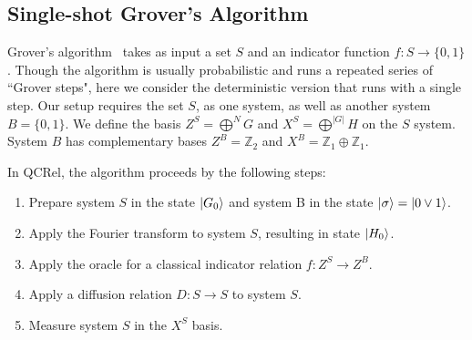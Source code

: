 \subsection{Single-shot Grover's Algorithm}

Grover's algorithm~\cite{grover1996fast} takes as input a set $S$ and an indicator function $f:S\to\{0,1\}$. Though the algorithm is usually probabilistic and runs a repeated series of ``Grover steps", here we consider the deterministic version that runs with a single step. Our setup requires the set $S$, as one system, as well as another system $B=\{0,1\}$. We define the basis $Z^{S}=\bigoplus^NG$ and $X^S=\bigoplus^{|G|}H$ on the $S$ system.  System $B$ has complementary bases $Z^B=\mathbb{Z}_2$ and $X^B=\mathbb{Z}_1\oplus\mathbb{Z}_1$.

In QCRel, the algorithm proceeds by the following steps:
\begin{enumerate}
\item Prepare system $S$ in the state $| G_0 \rangle$ and system B in the state $| \sigma \rangle = | 0\vee 1 \rangle$.

\item Apply the Fourier transform to system $S$, resulting in state $| H_0 \rangle$.

\item Apply the oracle for a classical indicator relation $f:Z^S\to Z^B$.

\item Apply a diffusion relation $D:S\to S$ to system $S$.

\item Measure system $S$ in the $X^S$ basis.

\end{enumerate}

